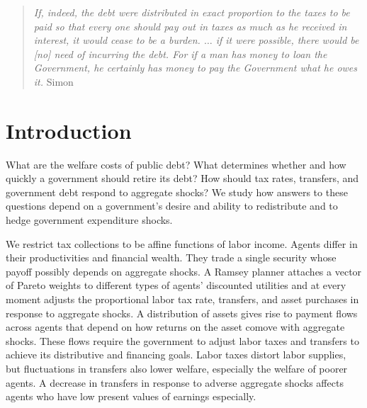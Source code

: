 \documentclass[thmsb,11pt]{article}
\begin{document}
\bigskip \newpage

\setcounter{page}{1}

\bigskip \baselineskip0.65cm


%


%

 \begin{quote}
 \emph{If, indeed, the debt were distributed in exact proportion to the taxes
 to be paid so that every one should pay out in taxes as much as he received
 in interest, it would cease to be a burden.%
 $\ldots$ if it were possible, there
 would be [no] need of incurring the debt. For if a man has money to loan the
 Government, he certainly has money to pay the Government what he owes it.
 }Simon \citet[p.85]{newcomb1865critical}
 \end{quote}



\section{Introduction}
\color{black}
What are the welfare costs of public debt? What determines whether and how quickly a government should retire its debt? How should  tax rates, transfers, and government debt respond to aggregate shocks? We study how answers to these questions depend on a government's desire and ability to redistribute
and
to hedge government expenditure shocks.

We restrict tax collections to be   affine functions of labor income. Agents differ in
their productivities and financial wealth.  They  trade a single  security whose payoff possibly depends on aggregate shocks.
A Ramsey planner attaches  a  vector of Pareto weights to different types of agents' discounted utilities and at every moment adjusts
the proportional labor  tax rate, transfers, and asset purchases in response to aggregate shocks.
A distribution of assets  gives rise to payment flows across  agents that depend on how returns on the asset comove with aggregate shocks. These
  flows require the government  to adjust labor taxes and transfers  to achieve its distributive and financing goals. Labor taxes distort  labor supplies, but fluctuations in  transfers also lower welfare, especially the welfare of poorer agents.
 A decrease in transfers in response to adverse aggregate shocks   affects agents who have low present values of earnings especially.
\end{document}
